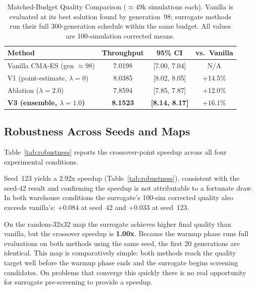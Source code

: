 \documentclass[conference]{IEEEtran}
\begin{document}
\begin{table}[htbp]
  \caption{Matched-Budget Quality Comparison ($\approx$49k simulations each).
           Vanilla is evaluated at its best solution found by generation~98;
           surrogate methods run their full 300-generation schedule within
           the same budget. All values are 100-simulation corrected means.}
  \label{tab:results}
  \begin{center}
    \begin{tabular}{lccc}
      \toprule
      \textbf{Method} & \textbf{Throughput} & \textbf{95\% CI} & \textbf{vs.\ Vanilla} \\
      \midrule
      Vanilla CMA-ES (gen $\approx$98)          & 7.0198 & [7.00, 7.04] & N/A            \\
      V1 (point-estimate, $\lambda=0$)            & 8.0385 & [8.02, 8.05] & $+$14.5\%      \\
      Ablation ($\lambda=2.0$)                    & 7.8594 & [7.85, 7.87] & $+$12.0\%      \\
      \textbf{V3 (ensemble, $\lambda=1.0$)}   & \textbf{8.1523} & \textbf{[8.14, 8.17]} & $\mathbf{+16.1\%}$ \\
      \bottomrule
    \end{tabular}
  \end{center}
\end{table}

\subsection{Robustness Across Seeds and Maps}
\label{sec:robustness}

Table~\ref{tab:robustness} reports the crossover-point speedup across all
four experimental conditions.

Seed~123 yields a 2.92x speedup (Table~\ref{tab:robustness}), consistent
with the seed-42 result and confirming the speedup is not attributable to
a fortunate draw. In both warehouse conditions the surrogate's 100-sim
corrected quality also exceeds vanilla's: $+0.084$ at seed~42 and
$+0.033$ at seed~123.

On the random-32x32 map the surrogate achieves higher final quality than
vanilla, but the crossover speedup is \textbf{1.00x}. Because the warmup phase runs full evaluations
on both methods using the same seed, the first 20 generations are
identical. This map is comparatively simple: both methods reach the quality
target well before the warmup phase ends and the surrogate begins screening
candidates. On problems that converge this quickly there is no real
opportunity for surrogate pre-screening to provide a speedup.
\end{document}
